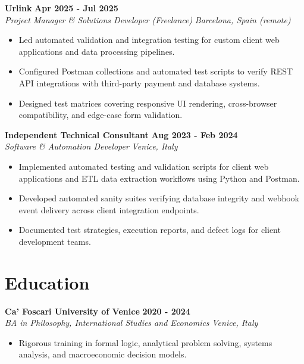 \documentclass[10pt,a4paper]{article}
\newcommand{\role}[4]{%
  \textbf{#1} \hfill \textbf{#2}\\[1pt]%
  \textit{#3} \hfill \textit{#4}\\[2pt]%
}
\begin{document}
\role{Urlink}{Apr 2025 - Jul 2025}{Project Manager \& Solutions Developer (Freelance)}{Barcelona, Spain (remote)}
\begin{itemize}
  \item Led automated validation and integration testing for custom client web applications and data processing pipelines.
  \item Configured Postman collections and automated test scripts to verify REST API integrations with third-party payment and database systems.
  \item Designed test matrices covering responsive UI rendering, cross-browser compatibility, and edge-case form validation.
\end{itemize}

\role{Independent Technical Consultant}{Aug 2023 - Feb 2024}{Software \& Automation Developer}{Venice, Italy}
\begin{itemize}
  \item Implemented automated testing and validation scripts for client web applications and ETL data extraction workflows using Python and Postman.
  \item Developed automated sanity suites verifying database integrity and webhook event delivery across client integration endpoints.
  \item Documented test strategies, execution reports, and defect logs for client development teams.
\end{itemize}

\section{Education}
\role{Ca' Foscari University of Venice}{2020 - 2024}{BA in Philosophy, International Studies and Economics}{Venice, Italy}
\begin{itemize}
  \item Rigorous training in formal logic, analytical problem solving, systems analysis, and macroeconomic decision models.
\end{itemize}
\end{document}
